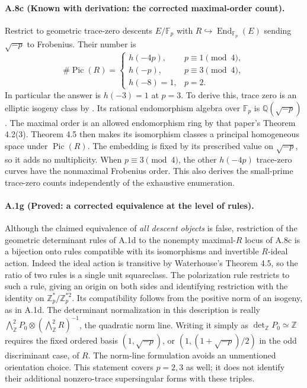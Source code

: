 \paragraph{A.8c (Known with derivation: the corrected maximal-order count).}
Restrict to geometric trace-zero descents $E/\mathbb F_p$ with
$R\hookrightarrow\operatorname{End}_{\mathbb F_p}(E)$ sending
$\sqrt{-p}$ to Frobenius. Their number is
\[
 \#\operatorname{Pic}(R)=
 \begin{cases}h(-4p),&p\equiv1\pmod4,\\
 h(-p),&p\equiv3\pmod4,\\
 h(-8)=1,&p=2.
 \end{cases}
\]
In particular the answer is $h(-3)=1$ at $p=3$.
To derive this, trace zero is an elliptic isogeny class by
\citet[Theorem 4.1(5)]{Waterhouse1969}. Its rational endomorphism
algebra over $\mathbb F_p$ is $\mathbb Q(\sqrt{-p})$.
The maximal order is an allowed endomorphism ring by that paper's
Theorem 4.2(3). Theorem 4.5 then makes its isomorphism classes a
principal homogeneous space under $\operatorname{Pic}(R)$.
The embedding is fixed by its prescribed value on $\sqrt{-p}$, so
it adds no multiplicity. When $p\equiv3\pmod4$, the other
$h(-4p)$ trace-zero curves have the nonmaximal Frobenius order.
This also derives the small-prime trace-zero counts independently
of the exhaustive enumeration.

\paragraph{A.1g (Proved: a corrected equivalence at the level of rules).}
Although the claimed equivalence of \emph{all descent objects} is
false, restriction of the geometric determinant rules of A.1d to
the nonempty maximal-$R$ locus of A.8c is a bijection onto rules
compatible with its isomorphisms and invertible $R$-ideal action.
Indeed the ideal action is transitive by Waterhouse's Theorem 4.5,
so the ratio of two rules is a single unit squareclass. The
polarization rule restricts to such a rule, giving an origin on both
sides and identifying restriction with the identity on
$\mathbb Z_p^*/\mathbb Z_p^{*2}$. Its compatibility follows from
the positive norm of an isogeny, as in A.1d. The determinant
normalization in this description is really
$\bigwedge^2_{\mathbb Z}P_0\otimes
(\bigwedge^2_{\mathbb Z}R)^{-1}$, the quadratic norm line.
Writing it simply as $\det_{\mathbb Z}P_0\simeq\mathbb Z$ requires
the fixed ordered basis $(1,\sqrt{-p})$, or
$(1,(1+\sqrt{-p})/2)$ in the odd discriminant case, of $R$.
The norm-line formulation avoids an unmentioned orientation choice.
This statement covers $p=2,3$ as well; it does not identify their
additional nonzero-trace supersingular forms with these triples.

